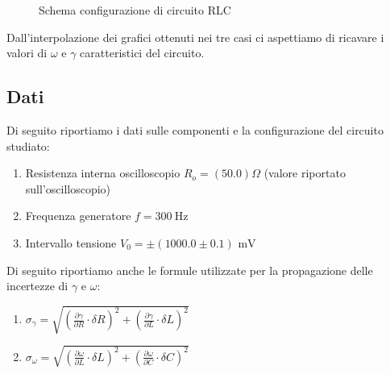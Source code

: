 \documentclass[letterpaper,12pt]{article}
\begin{document}
\begin{figure}[h!]
    \centering
    \caption{Schema configurazione di circuito RLC}
    \label{fig:config_circuito_RLC}
\end{figure}

Dall'interpolazione dei grafici ottenuti nei tre casi ci aspettiamo di ricavare i valori di $\omega$ e $\gamma$ caratteristici del circuito.

\subsection{Dati} %
Di seguito riportiamo i dati sulle componenti e la configurazione del circuito studiato:

\begin{enumerate}[itemsep=1pt]
    \item Resistenza interna oscilloscopio $R_o = (50.0)\Omega$ (valore riportato sull'oscilloscopio)  
    \item Frequenza generatore $f = \SI{300}{\hertz}$
    \item Intervallo tensione $V_0= \pm (1000.0\pm0.1)\text{ mV}$ 
\end{enumerate}
Di seguito riportiamo anche le formule utilizzate per la propagazione delle incertezze di $\gamma$ e $\omega$:
\begin{enumerate}
    \item $ \sigma_{\gamma} = \sqrt{(\frac{\partial \gamma}{\partial R} \cdot \delta R)^2 + (\frac{\partial \gamma}{\partial L}\cdot \delta L)^2} $
    \item $ \sigma_{\omega} = \sqrt{(\frac{\partial \omega}{\partial L} \cdot \delta L)^2 + (\frac{\partial \omega}{\partial C}\cdot \delta C)^2} $
\end{enumerate}
\end{document}
